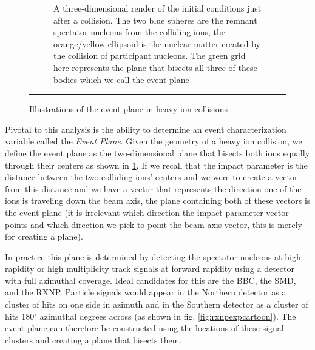 \begin{figure}[htbp!]
\begin{subfigure}[p]{0.7\textwidth}
	\caption[Central vs Peripheral collisions, geometry of initial conditions]{A three-dimensional render of the initial conditions just after a collision. The two blue spheres are the remnant spectator nucleons from the colliding ions, the orange/yellow ellipsoid is the nuclear matter created by the collision of participant nucleons. The green grid here represents the plane that bisects all three of these bodies which we call the event plane}
    \end{subfigure}
    \rule{35em}{0.5pt}
  \caption[Illustrations of the event plane in heavy ion collisions]{Illustrations of the event plane in heavy ion collisions}
  \label{fig:evtpln}
\end{figure}

Pivotal to this analysis is the ability to determine an event characterization variable called the \textit{Event Plane}. Given the geometry of a heavy ion collision, we define the event plane as the two-dimensional plane that bisects both ions equally through their centers as shown in \ref{fig:evtpln}. If we recall that the impact parameter is the distance between the two colliding ions' centers and we were to create a vector from this distance and we have a vector that represents the direction one of the ions is traveling down the beam axis, the plane containing both of these vectors is the event plane (it is irrelevant which direction the impact parameter vector points and which direction we pick to point the beam axis vector, this is merely for creating a plane).

In practice this plane is determined by detecting the spectator nucleons at high rapidity or high multiplicity track signals at forward rapidity using a detector with full azimuthal coverage. Ideal candidates for this are the BBC, the SMD, and the RXNP. Particle signals would appear in the Northern detector as a cluster of hits on one side in azimuth and in the Southern detector as a cluster of hits 180$^\circ$ azimuthal degrees across (as shown in fig. \ref{fig:rxnpexpcartoon}). The event plane can therefore be constructed using the locations of these signal clusters and creating a plane that bisects them.

